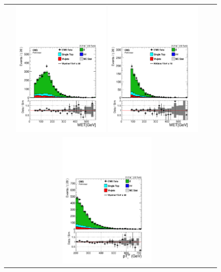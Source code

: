  \begin{figure}[htbp]
 \centering
 \begin{tabular}{cc}
 \includegraphics[width=0.45\textwidth]{chapters/Chapter8-EventSelection/Figures/WVanalysis/ControlPlots_TTbar/mu/pfMET_0}
 \includegraphics[width=0.45\textwidth]{chapters/Chapter8-EventSelection/Figures/WVanalysis/ControlPlots_TTbar/el/pfMET_0}\\
 \includegraphics[width=0.45\textwidth]{chapters/Chapter8-EventSelection/Figures/WVanalysis/ControlPlots_TTbar/mu/v_pt_0}

\end{tabular}
\end{figure}
